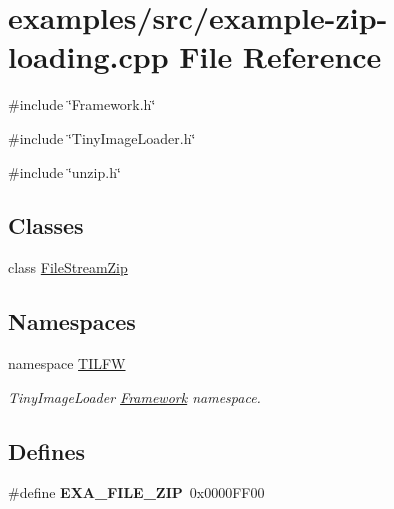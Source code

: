 \hypertarget{example-zip-loading_8cpp}{
\section{examples/src/example-\/zip-\/loading.cpp File Reference}
\label{example-zip-loading_8cpp}
}
{\ttfamily \#include \char`\"{}Framework.h\char`\"{}}\par
{\ttfamily \#include \char`\"{}TinyImageLoader.h\char`\"{}}\par
{\ttfamily \#include \char`\"{}unzip.h\char`\"{}}\par
\subsection*{Classes}
\begin{DoxyCompactItemize}
\item 
class \hyperlink{class_file_stream_zip}{FileStreamZip}
\end{DoxyCompactItemize}
\subsection*{Namespaces}
\begin{DoxyCompactItemize}
\item 
namespace \hyperlink{namespace_t_i_l_f_w}{TILFW}


\begin{DoxyCompactList}\small\item\em TinyImageLoader \hyperlink{class_t_i_l_f_w_1_1_framework}{Framework} namespace. \item\end{DoxyCompactList}

\end{DoxyCompactItemize}
\subsection*{Defines}
\begin{DoxyCompactItemize}
\item 
\hypertarget{example-zip-loading_8cpp_a04c668ff2b954ddc7e55568ac8d2b811}{
\#define {\bfseries EXA\_\-FILE\_\-ZIP}~0x0000FF00}
\label{example-zip-loading_8cpp_a04c668ff2b954ddc7e55568ac8d2b811}

\end{DoxyCompactItemize}
